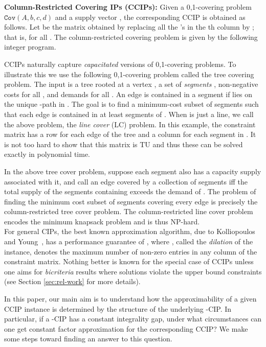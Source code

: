 \documentclass[11pt]{article}
\newcommand{\cov}[1]{\ensuremath{\mathtt{Cov}(#1)}}
\newcommand{\1}{\mathbb{1}}
\begin{document}
\noindent
 {\bf Column-Restricted Covering IPs (CCIPs):}  
Given a 0,1-covering problem \cov{A,b,c,d} and a supply vector
, the corresponding CCIP is obtained as follows. Let
 be the matrix obtained by replacing all the 's in the th
column by ; that is,  for all . The column-restricted covering problem is given 
by the following integer program.


\noindent
CCIPs naturally capture {\em capacitated} versions of 0,1-covering 
problems. To illustrate this we use the following 0,1-covering problem
called the tree covering problem.
The input is a tree
  rooted at a vertex , a set of {\em segments} ,
  non-negative costs  for all , and demands  for all . An edge  is contained in a segment
   if  lies on the unique -path in .  The goal is
  to find a minimum-cost subset  of segments such that each edge  is contained in at least  segments of .  When 
  is just a line, we call the above problem, the {\em line cover} (LC)
  problem.  In this example, the constraint matrix  has a row for
  each edge of the tree and a column for each segment in . 
  It is not too hard to show that this matrix is TU and thus these can be solved exactly
  in polynomial time.
  

In the above tree cover problem, suppose each segment
 also has a capacity supply  associated with it, and
call an edge  covered by a collection of segments  iff the total
supply of the segments containing  exceeds the demand of . 
The problem of finding the minimum cost subset of segments covering 
every edge is precisely the column-restricted tree cover problem. The column-restricted 
line cover problem encodes the minimum knapsack problem and is thus 
NP-hard. \\
 
\noindent
For general CIPs, the best known approximation algorithm, due to
Kolliopoulos and Young~\cite{KY05}, has a performance guarantee of
, where , called the {\em dilation} of the instance,
denotes the maximum number of non-zero entries in any column of
the constraint matrix. Nothing better is known for the special case of CCIPs
unless one aims for {\em bicriteria} results where solutions 
violate the upper bound constraints  (see Section \ref{sec:rel-work} for more details). 

In this paper, our main aim is to understand how the approximability
of a given CCIP instance is determined by the structure of the
underlying -CIP. In particular, if a -CIP has a constant
integrality gap, under what circumstances can one get constant factor
approximation for the corresponding CCIP?  We make
some steps toward finding an answer to this question.
\end{document}
